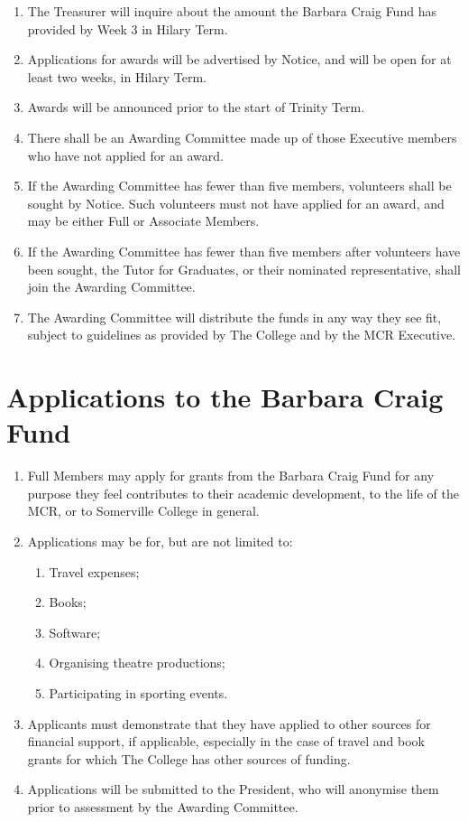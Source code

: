 \documentclass[11pt, a4paper]{article}
\begin{document}
\begin{enumerate}
    \item The Treasurer will inquire about the amount the Barbara Craig Fund has provided by Week 3 in Hilary Term.
    \item Applications for awards will be advertised by Notice, and will be open for at least two weeks, in Hilary Term.
    \item Awards will be announced prior to the start of Trinity Term.
    \item There shall be an Awarding Committee made up of those Executive members who have not applied for an award.
    \item If the Awarding Committee has fewer than five members, volunteers shall be sought by Notice.  Such volunteers must not have applied for an award, and may be either Full or Associate Members.
    \item If the Awarding Committee has fewer than five members after volunteers have been sought, the Tutor for Graduates, or their nominated representative, shall join the Awarding Committee.
    \item The Awarding Committee will distribute the funds in any way they see fit, subject to guidelines as provided by The College and by the MCR Executive.
\end{enumerate}





\section{Applications to the Barbara Craig Fund}
\label{sec:applications}

\begin{enumerate}
    \item Full Members may apply for grants from the Barbara Craig Fund for any purpose they feel contributes to their academic development, to the life of the MCR, or to Somerville College in general.
    \item Applications may be for, but are not limited to:
    \begin{enumerate}
        \item Travel expenses;
        \item Books;
        \item Software;
        \item Organising theatre productions;
        \item Participating in sporting events.
    \end{enumerate}
    \item Applicants must demonstrate that they have applied to other sources for financial support, if applicable, especially in the case of travel and book grants for which The College has other sources of funding.
    \item Applications will be submitted to the President, who will anonymise them prior to  assessment by the Awarding Committee.
\end{enumerate}
\end{document}
